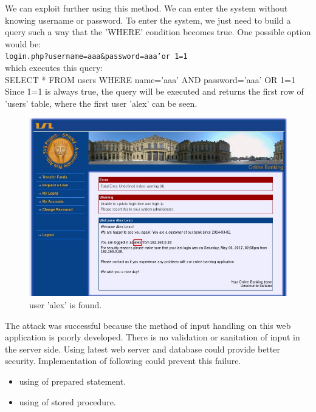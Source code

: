 \documentclass[12pt]{report}
\begin{document}
	
	We can exploit further using this method. We can enter the system without knowing username or password. To enter the system, we just need to build a query such a way that the 'WHERE' condition becomes true. One possible option would be:\\ 
	{\tt login.php?username=aaa\&password=aaa'or 1=1}
	\\which executes this query: 
	\\{\sf SELECT * FROM users WHERE name='aaa' AND password='aaa' OR 1=1}
	\\Since 1=1 is always true, the query will be executed and returns the first row of 'users' table, where the first user 'alex' can be seen.
	\begin{figure}[H]
		\includegraphics[width=0.75\textheight,height=0.4\textheight]{images/usernamefound.jpg}
		\caption{user 'alex' is found.}
	\end{figure}

	The attack was successful because the method of input handling on this web application is poorly developed. There is no validation or sanitation of input in the server side. Using latest web server and database could provide better security. Implementation of following could prevent this failure.
	\begin{itemize}
		\item using of prepared statement.
		\item using of stored procedure.
	\end{itemize}
	
\end{document}
